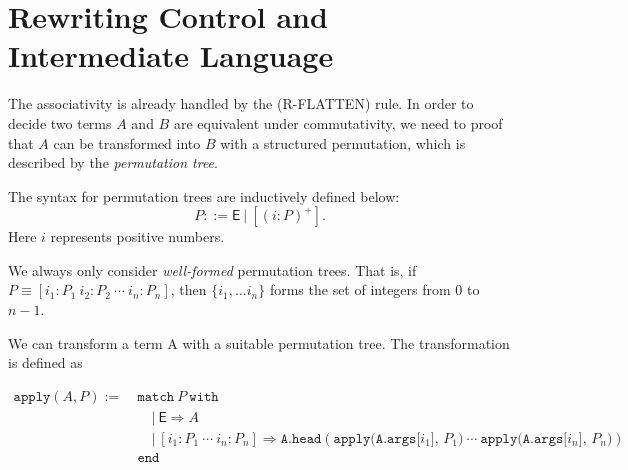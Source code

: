 \documentclass{article}
\begin{document}
\section{Rewriting Control and Intermediate Language}
The associativity is already handled by the (R-FLATTEN) rule. In order to decide two terms $A$ and $B$ are equivalent under commutativity, we need to proof that $A$ can be transformed into $B$ with a structured permutation, which is described by the \textit{permutation tree}.

\begin{definition}
    The syntax for permutation trees are inductively defined below:
    \[
    P ::= \mathsf{E}\ |\ [(i:P)^+].
    \]
    Here $i$ represents positive numbers.
\end{definition}
We always only consider \textit{well-formed} permutation trees. That is, if $P \equiv [i_1:P_1\ i_2:P_2\ \cdots\ i_n:P_n]$, then $\{i_1, ... i_n\}$ forms the set of integers from $0$ to $n-1$.

We can transform a term A with a suitable permutation tree. The transformation is defined as

\begin{align*}
    \texttt{apply}(A, P) :=\ & \texttt{match}\ P\ \texttt{with} \\
    & \quad |\ \textsf{E} \Rightarrow A \\
    & \quad |\ [i_1:P_1\ \cdots\ i_n:P_n] \Rightarrow \texttt{A.head}(\texttt{apply(A.args[$i_1$], $P_1$)}\ \cdots\ \texttt{apply(A.args[$i_n$], $P_n$)}) \\
    & \texttt{end}
\end{align*}


\end{document}
